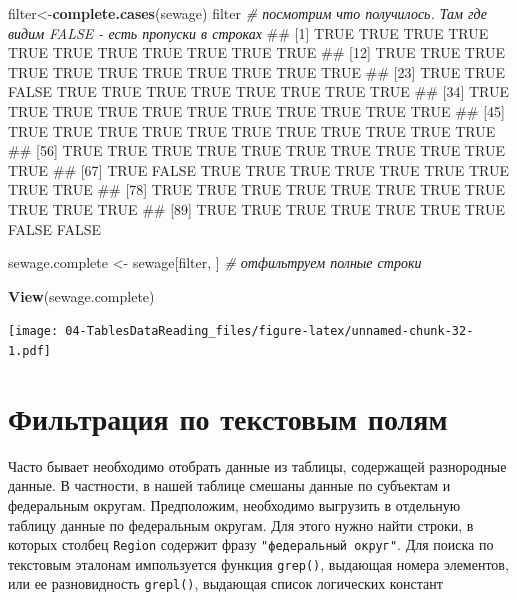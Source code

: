 \documentclass[]{book}
\newenvironment{Shaded}{\begin{snugshade}}{\end{snugshade}}
\newcommand{\KeywordTok}[1]{\textcolor[rgb]{0.13,0.29,0.53}{\textbf{#1}}}
\newcommand{\StringTok}[1]{\textcolor[rgb]{0.31,0.60,0.02}{#1}}
\newcommand{\CommentTok}[1]{\textcolor[rgb]{0.56,0.35,0.01}{\textit{#1}}}
\newcommand{\NormalTok}[1]{#1}
\begin{document}
\begin{Shaded}
\begin{Highlighting}[]
\NormalTok{filter<-}\KeywordTok{complete.cases}\NormalTok{(sewage)}
\NormalTok{filter  }\CommentTok{# посмотрим что получилось. Там где видим FALSE - есть пропуски в строках}
\NormalTok{##  [1]  TRUE  TRUE  TRUE  TRUE  TRUE  TRUE  TRUE  TRUE  TRUE  TRUE  TRUE}
\NormalTok{## [12]  TRUE  TRUE  TRUE  TRUE  TRUE  TRUE  TRUE  TRUE  TRUE  TRUE  TRUE}
\NormalTok{## [23]  TRUE  TRUE FALSE  TRUE  TRUE  TRUE  TRUE  TRUE  TRUE  TRUE  TRUE}
\NormalTok{## [34]  TRUE  TRUE  TRUE  TRUE  TRUE  TRUE  TRUE  TRUE  TRUE  TRUE  TRUE}
\NormalTok{## [45]  TRUE  TRUE  TRUE  TRUE  TRUE  TRUE  TRUE  TRUE  TRUE  TRUE  TRUE}
\NormalTok{## [56]  TRUE  TRUE  TRUE  TRUE  TRUE  TRUE  TRUE  TRUE  TRUE  TRUE  TRUE}
\NormalTok{## [67]  TRUE FALSE  TRUE  TRUE  TRUE  TRUE  TRUE  TRUE  TRUE  TRUE  TRUE}
\NormalTok{## [78]  TRUE  TRUE  TRUE  TRUE  TRUE  TRUE  TRUE  TRUE  TRUE  TRUE  TRUE}
\NormalTok{## [89]  TRUE  TRUE  TRUE  TRUE  TRUE  TRUE  TRUE FALSE FALSE}

\NormalTok{sewage.complete <-}\StringTok{ }\NormalTok{sewage[filter, ] }\CommentTok{# отфильтруем полные строки}
\end{Highlighting}
\end{Shaded}

\begin{Shaded}
\begin{Highlighting}[]
\KeywordTok{View}\NormalTok{(sewage.complete)}
\end{Highlighting}
\end{Shaded}

\texttt{[image: 04-TablesDataReading\_files/figure-latex/unnamed-chunk-32-1.pdf]}

\section{Фильтрация по текстовым полям}\label{filtering_text}

Часто бывает необходимо отобрать данные из таблицы, содержащей
разнородные данные. В частности, в нашей таблице смешаны данные по
субъектам и федеральным округам. Предположим, необходимо выгрузить в
отдельную таблицу данные по федеральным округам. Для этого нужно найти
строки, в которых столбец \texttt{Region} содержит фразу
\texttt{"федеральный\ округ"}. Для поиска по текстовым эталонам
импользуется функция \texttt{grep()}, выдающая номера элементов, или ее
разновидность \texttt{grepl()}, выдающая список логических констант
\end{document}
